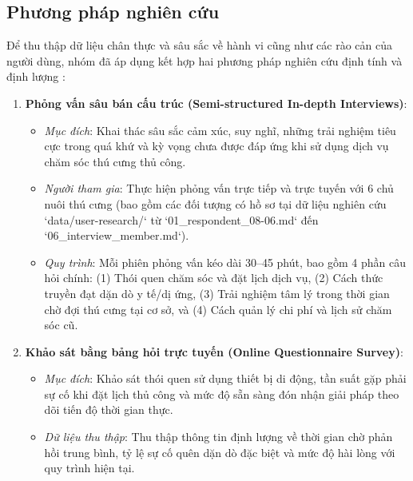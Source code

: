 \subsection{Phương pháp nghiên cứu}
Để thu thập dữ liệu chân thực và sâu sắc về hành vi cũng như các rào cản của người dùng, nhóm đã áp dụng kết hợp hai phương pháp nghiên cứu định tính và định lượng \cite{cooper2014aboutface, sharp2019interaction}:
\begin{enumerate}
    \item \textbf{Phỏng vấn sâu bán cấu trúc (Semi-structured In-depth Interviews)}:
    \begin{itemize}
        \item \textit{Mục đích}: Khai thác sâu sắc cảm xúc, suy nghĩ, những trải nghiệm tiêu cực trong quá khứ và kỳ vọng chưa được đáp ứng khi sử dụng dịch vụ chăm sóc thú cưng thủ công.
        \item \textit{Người tham gia}: Thực hiện phỏng vấn trực tiếp và trực tuyến với 6 chủ nuôi thú cưng (bao gồm các đối tượng có hồ sơ tại dữ liệu nghiên cứu `data/user-research/` từ `01_respondent_08-06.md` đến `06_interview_member.md`).
        \item \textit{Quy trình}: Mỗi phiên phỏng vấn kéo dài 30--45 phút, bao gồm 4 phần câu hỏi chính: (1) Thói quen chăm sóc và đặt lịch dịch vụ, (2) Cách thức truyền đạt dặn dò y tế/dị ứng, (3) Trải nghiệm tâm lý trong thời gian chờ đợi thú cưng tại cơ sở, và (4) Cách quản lý chi phí và lịch sử chăm sóc cũ.
    \end{itemize}
    \item \textbf{Khảo sát bằng bảng hỏi trực tuyến (Online Questionnaire Survey)}:
    \begin{itemize}
        \item \textit{Mục đích}: Khảo sát thói quen sử dụng thiết bị di động, tần suất gặp phải sự cố khi đặt lịch thủ công và mức độ sẵn sàng đón nhận giải pháp theo dõi tiến độ thời gian thực.
        \item \textit{Dữ liệu thu thập}: Thu thập thông tin định lượng về thời gian chờ phản hồi trung bình, tỷ lệ sự cố quên dặn dò đặc biệt và mức độ hài lòng với quy trình hiện tại.
    \end{itemize}
\end{enumerate}

